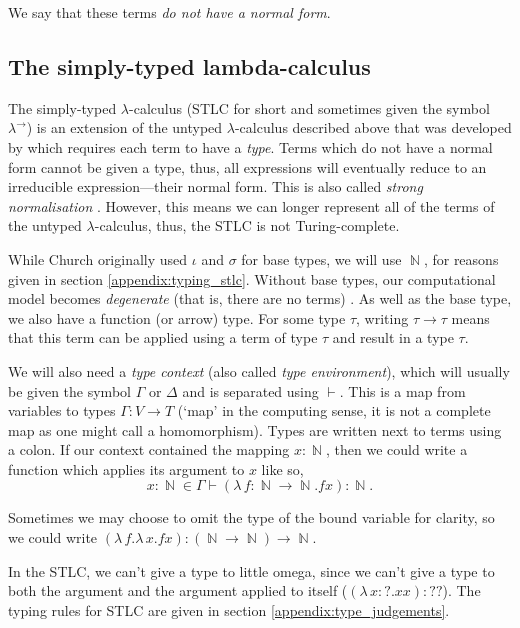 \documentclass[logo,bsc,singlespacing,parskip,online]{infthesis}
\DeclareMathOperator{\nat}{\mathbb{N}}
\begin{document}
We say that these terms \textit{do not have a normal form}.

\subsection{The simply-typed lambda-calculus}
The simply-typed $\lambda$-calculus (STLC for short and sometimes given the symbol
$\lambda^{\rightarrow}$) is an extension of the untyped $\lambda$-calculus described above that was
developed by \citet{church_formulation_1940} which requires each term to have a \textit{type}. Terms
which do not have a normal form cannot be given a type, thus, all expressions will eventually reduce
to an irreducible expression---their normal form. This is also called \textit{strong normalisation}
\citep{pierce_types_2002}. However, this means we can longer represent all of the terms of the
untyped $\lambda$-calculus, thus, the STLC is not Turing-complete.

While Church originally used $\iota$ and $\sigma$ for base types, we will use $\nat$, for reasons
given in section \ref{appendix:typing_stlc}. Without base types, our computational model becomes
\textit{degenerate} (that is, there are no terms) \citep{pierce_types_2002}. As well as the base
type, we also have a function (or arrow) type. For some type $\tau$, writing $\tau \to \tau$ means
that this term can be applied using a term of type $\tau$ and result in a type $\tau$.

We will also need a \textit{type context} (also called \textit{type environment}), which will
usually be given the symbol $\Gamma$ or $\Delta$ and is separated using $\vdash$. This is a map from
variables to types $\Gamma \colon V \to T$ (`map' in the computing sense, it is not a complete map
as one might call a homomorphism). Types are written next to terms using a colon. If our context
contained the mapping $x \colon \nat$, then we could write a function which applies its argument to
$x$ like so,
\begin{equation*}
  x \colon \nat \in \Gamma \vdash (\lambda \, f \colon \nat \to \nat . f x) \colon \nat.
\end{equation*}

Sometimes we may choose to omit the type of the bound variable for clarity, so we could write
$(\lambda \, f. \lambda \, x. fx) \colon (\nat \to \nat) \to \nat$.

In the STLC, we can't give a type to little omega, since we can't give a type to both the argument
and the argument applied to itself ($(\lambda \, x  \colon ? . x x) \colon ??$). The typing rules for
STLC are given in section \ref{appendix:type_judgements}.
\end{document}
